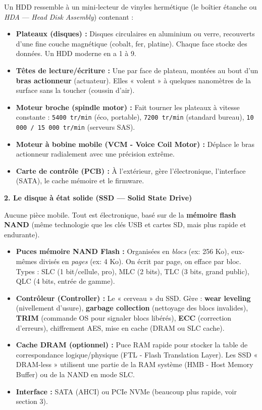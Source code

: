 \documentclass[11pt]{article}
\newcommand{\cle}[1]{{\popxbold\color{popdark}#1}}
\begin{document}
\begin{exemplebox}
Un HDD ressemble à un mini-lecteur de vinyles hermétique (le \cle{boîtier étanche} ou \emph{HDA} — \emph{Head Disk Assembly}) contenant :
\begin{itemize}
    \item \textbf{Plateaux (disques) :} Disques circulaires en aluminium ou verre, recouverts d'une fine couche magnétique (cobalt, fer, platine). Chaque face stocke des données. Un HDD moderne en a 1 à 9.
    \item \textbf{Têtes de lecture/écriture :} Une par face de plateau, montées au bout d'un \textbf{bras actionneur} (actuateur). Elles « volent » à quelques nanomètres de la surface sans la toucher (coussin d'air).
    \item \textbf{Moteur broche (spindle motor) :} Fait tourner les plateaux à vitesse constante : \texttt{5400 tr/min} (éco, portable), \texttt{7200 tr/min} (standard bureau), \texttt{10 000 / 15 000 tr/min} (serveurs SAS).
    \item \textbf{Moteur à bobine mobile (VCM - Voice Coil Motor) :} Déplace le bras actionneur radialement avec une précision extrême.
    \item \textbf{Carte de contrôle (PCB) :} À l'extérieur, gère l'électronique, l'interface (SATA), le cache mémoire et le firmware.
\end{itemize}
\end{exemplebox}

\textbf{2. Le disque à état solide (SSD — Solid State Drive)}\par
Aucune pièce mobile. Tout est électronique, basé sur de la \textbf{mémoire flash NAND} (même technologie que les clés USB et cartes SD, mais plus rapide et endurante).

\begin{exemplebox}
\begin{itemize}
    \item \textbf{Puces mémoire NAND Flash :} Organisées en \emph{blocs} (ex: 256 Ko), eux-mêmes divisés en \emph{pages} (ex: 4 Ko). On écrit par page, on efface par bloc. Types : SLC (1 bit/cellule, pro), MLC (2 bits), TLC (3 bits, grand public), QLC (4 bits, entrée de gamme).
    \item \textbf{Contrôleur (Controller) :} Le « cerveau » du SSD. Gère : \textbf{wear leveling} (nivellement d'usure), \textbf{garbage collection} (nettoyage des blocs invalides), \textbf{TRIM} (commande OS pour signaler blocs libérés), \textbf{ECC} (correction d'erreurs), chiffrement AES, mise en cache (DRAM ou SLC cache).
    \item \textbf{Cache DRAM (optionnel) :} Puce RAM rapide pour stocker la table de correspondance logique/physique (FTL - Flash Translation Layer). Les SSD « DRAM-less » utilisent une partie de la RAM système (HMB - Host Memory Buffer) ou de la NAND en mode SLC.
    \item \textbf{Interface :} SATA (AHCI) ou PCIe NVMe (beaucoup plus rapide, voir section 3).
\end{itemize}
\end{exemplebox}
\end{document}

